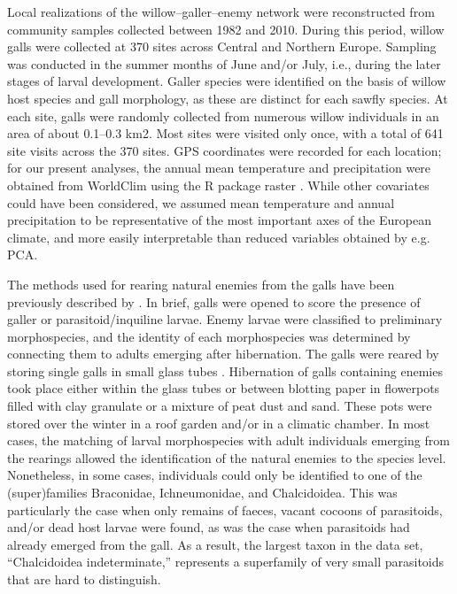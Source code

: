 \documentclass[12pt]{article}
\begin{document}
Local realizations of the willow–galler–enemy network were reconstructed from
community samples collected between 1982 and 2010. During this period, willow
galls were collected at 370 sites across Central and Northern Europe. Sampling
was conducted in the summer months of June and/or July, i.e., during the later
stages of larval development. Galler species were identified on the basis of
willow host species and gall morphology, as these are distinct for each sawfly
species. At each site, galls were randomly collected from numerous willow
individuals in an area of about 0.1–0.3 km2. Most sites were visited only
once, with a total of 641 site visits across the 370 sites. GPS coordinates
were recorded for each location; for our present analyses, the annual mean
temperature and precipitation were obtained from WorldClim using the R package
raster \citep{Hijmans2015}. While other covariates could have been considered,
we assumed mean temperature and annual precipitation to be representative of
the most important axes of the European climate, and more easily interpretable
than reduced variables obtained by e.g. PCA.

The methods used for rearing natural enemies from the galls have been
previously described by \citep{Kopelke1999, Kopelke2003}. In brief, galls were
opened to score the presence of galler or parasitoid/inquiline larvae. Enemy
larvae were classified to preliminary morphospecies, and the identity of each
morphospecies was determined by connecting them to adults emerging after
hibernation. The galls were reared by storing single galls in small glass
tubes \citep{Kopelke1985a}. Hibernation of galls containing enemies took place
either within the glass tubes or between blotting paper in flowerpots filled
with clay granulate or a mixture of peat dust and sand. These pots were stored
over the winter in a roof garden and/or in a climatic chamber. In most cases,
the matching of larval morphospecies with adult individuals emerging from the
rearings allowed the identification of the natural enemies to the species
level. Nonetheless, in some cases, individuals could only be identified to one
of the (super)families Braconidae, Ichneumonidae, and Chalcidoidea. This was
particularly the case when only remains of faeces, vacant cocoons of
parasitoids, and/or dead host larvae were found, as was the case when
parasitoids had already emerged from the gall. As a result, the largest taxon
in the data set, “Chalcidoidea indeterminate,” represents a superfamily of
very small parasitoids that are hard to distinguish.
\end{document}
